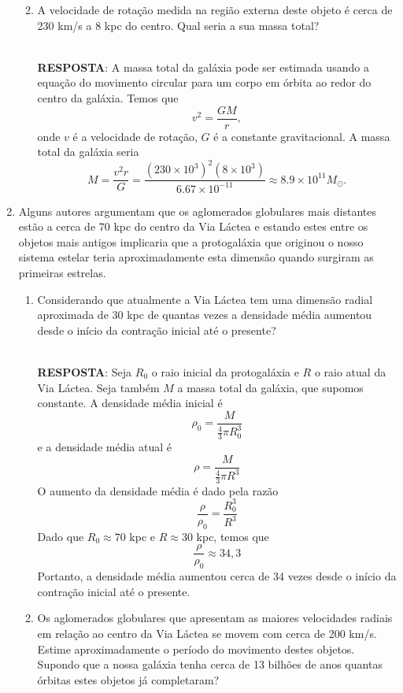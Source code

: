\documentclass[a4paper,12pt]{article}
\begin{document}
\begin{enumerate}
\begin{enumerate}
\noindent\hrulefill

\item A velocidade de rotação medida na região externa deste objeto é cerca de 230 km/s a 8 kpc do centro. Qual seria a sua massa total?

\noindent\hrulefill\\\textbf{RESPOSTA}: A massa total da galáxia pode ser estimada usando a equação do movimento circular para um corpo em órbita ao redor do centro da galáxia. Temos que
$$ v^2 = \frac{GM}{r}, $$
onde $v$ é a velocidade de rotação, $G$ é a constante gravitacional. A massa total da galáxia seria
$$ M = \frac{v^2 r}{G} = \frac{(230\times 10^3)^2 (8\times 10^3)}{6.67\times 10^{-11}} \approx 8.9\times 10^{11} M_\odot.$$

\end{enumerate}

\noindent\hrulefill

\item Alguns autores argumentam que os aglomerados globulares mais distantes estão a cerca de 70 kpc do centro da Via Láctea e estando estes entre os objetos mais antigos implicaria que a protogaláxia que originou o nosso sistema estelar teria aproximadamente esta dimensão quando surgiram as primeiras estrelas.
\begin{enumerate}
\item Considerando que atualmente a Via Láctea tem uma dimensão radial aproximada de 30 kpc de quantas vezes a densidade média aumentou desde o início da contração inicial até o presente?

\noindent\hrulefill\\\textbf{RESPOSTA}: Seja $R_0$ o raio inicial da protogaláxia e $R$ o raio atual da Via Láctea. Seja também $M$ a massa total da galáxia, que supomos constante. A densidade média inicial é $$\rho_0 = \frac{M}{\frac{4}{3}\pi R_0^3}$$ e a densidade média atual é $$\rho = \frac{M}{\frac{4}{3}\pi R^3}$$ O aumento da densidade média é dado pela razão $$\frac{\rho}{\rho_0} = \frac{R_0^3}{R^3}$$ Dado que $R_0 \approx 70$ kpc e $R \approx 30$ kpc, temos que $$\frac{\rho}{\rho_0} \approx 34,3$$ Portanto, a densidade média aumentou cerca de 34 vezes desde o início da contração inicial até o presente.

\noindent\hrulefill

\item Os aglomerados globulares que apresentam as maiores velocidades radiais em relação ao centro da Via Láctea se movem com cerca de 200 km/s. Estime aproximadamente o período do movimento destes objetos. Supondo que a nossa galáxia tenha cerca de 13 bilhões de anos quantas órbitas estes objetos já completaram?


\end{enumerate}
\end{enumerate}
\end{document}
